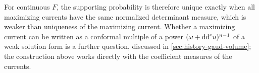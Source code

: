 For continuous $F$, the supporting probability is therefore unique exactly when all maximizing currents have the same normalized determinant measure, which is weaker than uniqueness of the maximizing current. Whether a maximizing current can be written as a conformal multiple of a power $(\omega+\mathrm{dd}^{\mathrm{c}} u)^{n-1}$ of a weak solution form is a further question, discussed in \cref{sec:history-gaud-volume}; the construction above works directly with the coefficient measures of the currents.
